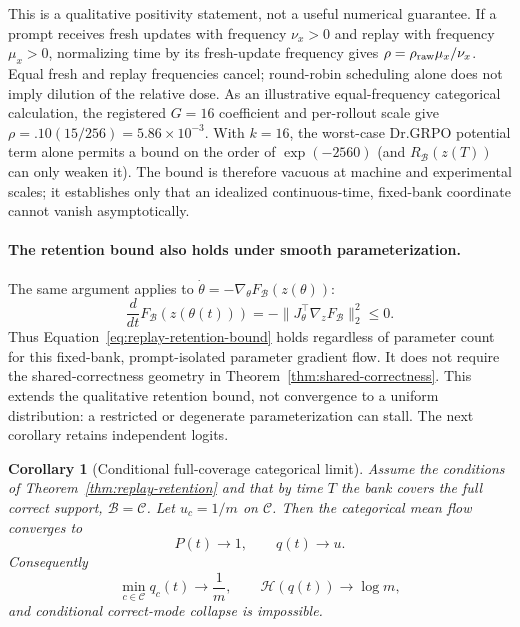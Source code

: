\documentclass{article}
\newcommand{\1}{\mathbf 1}
\newtheorem{corollary}[lemma]{Corollary}
\theoremstyle{remark}
\theoremstyle{definition}
\theoremstyle{plain}
\begin{document}
This is a qualitative positivity statement, not a useful numerical guarantee.
If a prompt receives fresh updates with frequency $\nu_x>0$ and replay with
frequency $\mu_x>0$, normalizing time by its fresh-update frequency gives
$\rho=\rho_{\rm raw}\mu_x/\nu_x$. Equal fresh and replay frequencies cancel;
round-robin scheduling alone does not imply dilution of the relative dose.
As an illustrative equal-frequency categorical calculation, the registered
$G=16$ coefficient and per-rollout scale give
$\rho=.10(15/256)=5.86\times10^{-3}$. With $k=16$, the worst-case Dr.GRPO
potential term alone permits a bound on the order of $\exp(-2560)$ (and
$R_{\mathcal B}(z(T))$ can only weaken it). The bound is therefore vacuous at
machine and experimental scales; it establishes only that an idealized
continuous-time, fixed-bank coordinate cannot vanish asymptotically.

\paragraph{The retention bound also holds under smooth parameterization.}
The same argument applies to $\dot\theta=-\nabla_\theta F_{\mathcal B}(z(\theta))$:
\[
 \frac{d}{dt}F_{\mathcal B}(z(\theta(t)))
 =-\lVert J_\theta^\top\nabla_zF_{\mathcal B}\rVert_2^2\le0.
\]
Thus Equation~\eqref{eq:replay-retention-bound} holds regardless of parameter
count for this fixed-bank, prompt-isolated parameter gradient flow. It does
not require the shared-correctness geometry in
Theorem~\ref{thm:shared-correctness}. This extends the qualitative retention
bound, not convergence to a uniform distribution: a restricted or degenerate
parameterization can stall. The next corollary retains independent logits.

\begin{corollary}[Conditional full-coverage categorical limit]
\label{cor:replay-no-collapse}
Assume the conditions of Theorem~\ref{thm:replay-retention} and that by time
$T$ the bank covers the full correct support, $\mathcal B=\mathcal C$. Let
$u_c=1/m$ on $\mathcal C$. Then the categorical mean flow converges to
\[
  P(t)\longrightarrow1,
  \qquad q(t)\longrightarrow u.
\]
Consequently
\[
  \min_{c\in\mathcal C}q_c(t)\longrightarrow\frac1m,
  \qquad
  \mathcal H(q(t))\longrightarrow\log m,
\]
and conditional correct-mode collapse is impossible.
\end{corollary}
\end{document}
